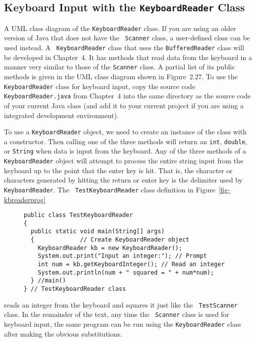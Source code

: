 \subsection{Keyboard Input with the {\tt KeyboardReader} Class} 

{A UML class diagram of the {\tt KeyboardReader} class.
\label{fig-kbreaderuml}}
If you are using an older version of Java that does not have the {\tt
Scanner} class, a user-defined class can be used instead.  A {\tt
KeyboardReader} class that uses the {\tt BufferedReader} class will be
developed in Chapter~4.  It has methods that read data from the
keyboard in a manner very similar to those of the {\tt Scanner} class.
A partial list of its public methods is given in the UML class diagram
shown in Figure~2.27.  To use the {\tt KeyboardReader} class for
keyboard input, copy the source code {\tt KeyboardReader.java} from
Chapter~4 into the same directory as the source code of your current
Java class (and add it to your current project if you are using a
integrated development environment).

To use a {\tt KeyboardReader} object, we need to create an instance 
of the class with a constructor. Then calling one of the three methods 
will return an {\tt int}, {\tt double}, or {\tt String} when data
is input from the keyboard.  Any of the three methods of a {\tt
KeyboardReader} object will attempt to process the entire string input
from the keyboard up to the point that the enter key is hit. That is,
the character or characters generated by hitting the return or enter
key is the delimiter used by {\tt KeyboardReader}.  The {\tt
TestKeyboardReader} class definition in Figure~\ref{fig-kbreaderprog}
\begin{figure}[htb]
\jjjprogstart
\begin{jjjlisting}
\begin{lstlisting}
public class TestKeyboardReader 
{
  public static void main(String[] args) 
  {             // Create KeyboardReader object
    KeyboardReader kb = new KeyboardReader(); 
    System.out.print("Input an integer:"); // Prompt
    int num = kb.getKeyboardInteger(); // Read an integer
    System.out.println(num + " squared = " + num*num);
  } //main()
} // TestKeyboardReader class
\end{lstlisting}
\end{jjjlisting}
\end{figure}
reads an integer from the keyboard and squares it just like the {\tt
TestScanner} class.  In the remainder of the text, any time the {\tt
Scanner} class is used for keyboard input, the same program can be run
using the {\tt KeyboardReader} class after making the obvious
substitutions.


